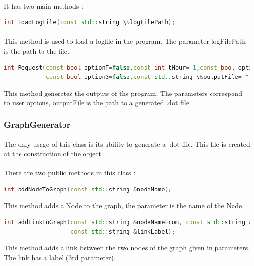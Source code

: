 \documentclass[a4paper, 12pts]{article}
\begin{document}
\paragraph{}
It has two main methods :
\begin{lstlisting}[language=C++]
int LoadLogFile(const std::string \&logFilePath);
\end{lstlisting}
\paragraph{}
This method is used to load a logfile in the program. The parameter logFilePath is the path to the file.

\begin{lstlisting}[language=C++]
int Request(const bool optionT=false,const int tHour=-1,const bool optionE=false,\
            const bool optionG=false,const std::string \&outputFile="");
\end{lstlisting}

This method generates the outputs of the program. The parameters correspond to user options, outputFile is the path to a generated .dot file
\subsubsection{GraphGenerator}
\paragraph{}
The only usage of this class is its ability to generate a .dot file. This file is created at the construction of the object.
\paragraph{}
There are two public methods in this class :

\begin{lstlisting}[language=C++]
int addNodeToGraph(const std::string &nodeName);
\end{lstlisting}

This method adds a Node to the graph, the parameter is the name of the Node.
\begin{lstlisting}[language=C++]
int addLinkToGraph(const std::string &nodeNameFrom, const std::string &nodeNameTo,\
                   const std::string &linkLabel);
\end{lstlisting}

This method adds a link between the two nodes of the graph given in parameters. The link has a label (3rd parameter).
\end{document}

